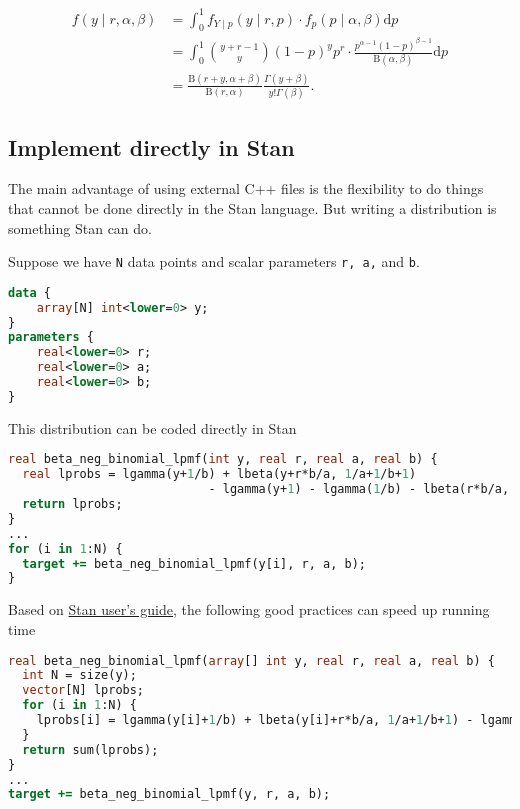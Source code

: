 \documentclass[11pt]{article}
\begin{document}
\begin{equation}
  \begin{aligned}
  f(y \mid r, \alpha ,\beta) &=\int_{0}^{1} f_{Y \mid p}(y \mid r,p) \cdot f_{p}(p \mid \alpha ,\beta )\mathrm {d} p \\ 
  &=\int_{0}^{1} {\binom {y+r-1}{y}} (1-p)^{y} p^{r} \cdot {\frac {p^{\alpha -1}(1-p)^{\beta -1}}{\mathrm{B} (\alpha ,\beta )}} \mathrm{d}p \\
  &= {\frac {\mathrm{B} (r+y,\alpha +\beta )}{\mathrm{B} (r,\alpha )}}{\frac {\Gamma (y+\beta )}{y! \Gamma (\beta )}}.
  \end{aligned}
\end{equation}





\subsection{Implement directly in Stan}

The main advantage of using external C++ files is the flexibility to do things that cannot be done directly in the Stan language. But writing a distribution is something Stan can do.

Suppose we have \verb|N| data points and scalar parameters \verb|r, a,| and \verb|b|.
\begin{lstlisting}[language=Stan, style=lgeneral]
data {
	array[N] int<lower=0> y;
}
parameters {
	real<lower=0> r;
	real<lower=0> a;
	real<lower=0> b;
}
\end{lstlisting}


This distribution can be coded directly in Stan
\begin{lstlisting}[language=Stan, style=lgeneral]
real beta_neg_binomial_lpmf(int y, real r, real a, real b) {
  real lprobs = lgamma(y+1/b) + lbeta(y+r*b/a, 1/a+1/b+1) 
  							- lgamma(y+1) - lgamma(1/b) - lbeta(r*b/a, 1/a+1);
  return lprobs;
}
...
for (i in 1:N) {
  target += beta_neg_binomial_lpmf(y[i], r, a, b);
}
\end{lstlisting}
Based on \href{https://mc-stan.org/docs/stan-users-guide/vectorization.html}{Stan user's guide}, the following good practices can speed up running time
\begin{lstlisting}[language=Stan, style=lgeneral]
real beta_neg_binomial_lpmf(array[] int y, real r, real a, real b) {
  int N = size(y);
  vector[N] lprobs;
  for (i in 1:N) {
    lprobs[i] = lgamma(y[i]+1/b) + lbeta(y[i]+r*b/a, 1/a+1/b+1) - lgamma(y[i]+1) - lgamma(1/b) - lbeta(r*b/a, 1/a+1);
  }
  return sum(lprobs);
}
...
target += beta_neg_binomial_lpmf(y, r, a, b);
\end{lstlisting}
\end{document}
